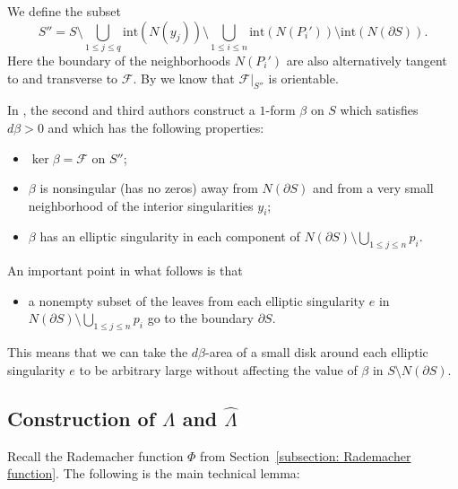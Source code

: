\documentclass[JEP,XML,SOM,Unicode,NoFloatCountersInSection]{cedram}
\let\mathcal\mathscr
\newcommand{\inte}{\mathrm{int}}
\theoremstyle{plain}
\theoremstyle{definition}
\numberwithin{equation}{subsection}
\newcommand{\cF}{\mathcal{F}}
\newcommand{\bdry}{\partial}
\begin{document}
We define the subset
\begin{equation}
S'' =S \setminus\bigcup_{1\leq j\leq q} \inte(N(y_j))\setminus\bigcup_{1\leq i\leq n} \inte(N(P_i')) \setminus\inte(N(\bdry S)).
\end{equation}
Here the boundary of the neighborhoods $N(P_i')$ are also alternatively tangent to and transverse to $\cF$. By \cite[Claim 6.4]{CH2} we know that $\cF \vert_{S''}$ is orientable.

In \cite[Prop.\,6.3]{CH2}, the second and third authors construct a $1$-form $\beta$ on $S$ which satisfies $d\beta>0$ and which has the following properties:
\begin{itemize}
\item[(P1)] $\ker \beta=\cF$ on $S''$;
\item[(P2)] $\beta$ is nonsingular (\ie has no zeros) away from $N(\bdry S)$ and from a very small neighborhood of the interior singularities $y_i$;
\item[(P3)] $\beta$ has an elliptic singularity in each component of $N(\bdry S)\setminus\bigcup_{1\leq j\leq n} p_i$.
\end{itemize}
An important point in what follows is that
\begin{itemize}
\item[(P4)] a nonempty subset of the leaves from each elliptic singularity $e$ in $N(\bdry S)\setminus\bigcup_{1\leq j\leq n} p_i$ go to the boundary $\partial S$.
\end{itemize}
This means that we can take the $d\beta$-area of a small disk around each elliptic singularity $e$ to be arbitrary large without affecting the value of $\beta$ in $S\setminus N(\bdry S)$.

\subsection{Construction of $\Lambda$ and $\widehat\Lambda$} \label{subsection: construction of Lambda}

Recall the Rademacher function $\Phi$ from Section~\ref{subsection: Rademacher function}. The following is the main technical lemma:
\end{document}
